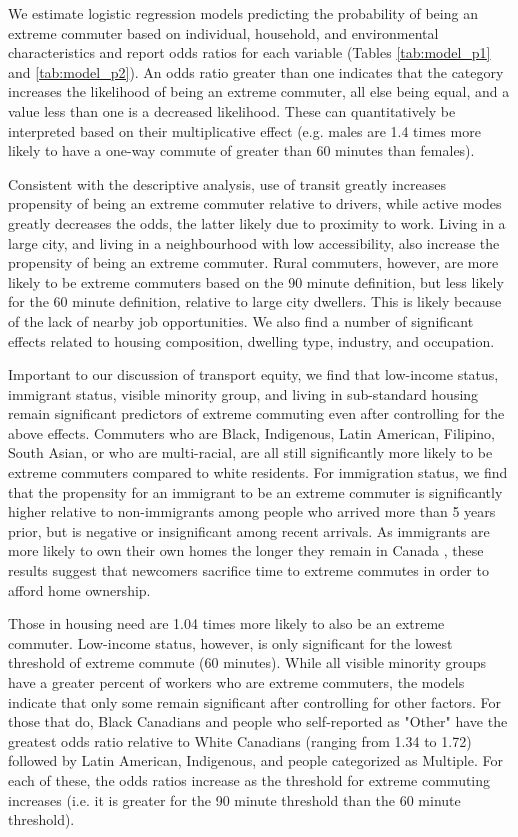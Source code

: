 \documentclass[10 pt,letterpaper]{article}
\begin{document}
\newpage


We estimate logistic regression models predicting the probability of being an extreme commuter based on individual, household, and environmental characteristics and report odds ratios for each variable (Tables \ref{tab:model_p1} and \ref{tab:model_p2}). An odds ratio greater than one indicates that the category increases the likelihood of being an extreme commuter, all else being equal, and a value less than one is a decreased likelihood. These can quantitatively be interpreted based on their multiplicative effect (e.g. males are 1.4 times more likely to have a one-way commute of greater than 60 minutes than females). 

Consistent with the descriptive analysis, use of transit greatly increases propensity of being an extreme commuter relative to drivers, while active modes greatly decreases the odds, the latter likely due to proximity to work. Living in a large city, and living in a neighbourhood with low accessibility, also increase the propensity of being an extreme commuter. Rural commuters, however, are more likely to be extreme commuters based on the 90 minute definition, but less likely for the 60 minute definition, relative to large city dwellers. This is likely because of the lack of nearby job opportunities. We also find a number of significant effects related to housing composition, dwelling type, industry, and occupation. 

Important to our discussion of transport equity, we find that low-income status, immigrant status, visible minority group, and living in sub-standard housing remain significant predictors of extreme commuting even after controlling for the above effects. Commuters who are Black, Indigenous, Latin American, Filipino, South Asian, or who are multi-racial, are all still significantly more likely to be extreme commuters compared to white residents. For immigration status, we find that the propensity for an immigrant to be an extreme commuter is significantly higher relative to non-immigrants among people who arrived more than 5 years prior, but is negative or insignificant among recent arrivals. As immigrants are more likely to own their own homes the longer they remain in Canada \cite{simone2014housing}, these results suggest that newcomers sacrifice time to extreme commutes in order to afford home ownership.

Those in housing need are 1.04 times more likely to also be an extreme commuter. Low-income status, however, is only significant for the lowest threshold of extreme commute (60 minutes).  While all visible minority groups have a greater percent of workers who are extreme commuters, the models indicate that only some remain significant after controlling for other factors. For those that do, Black Canadians and people who self-reported as "Other" have the greatest odds ratio relative to White Canadians (ranging from 1.34 to 1.72) followed by Latin American, Indigenous, and people categorized as Multiple. For each of these, the odds ratios increase as the threshold for extreme commuting increases (i.e. it is greater for the 90 minute threshold than the 60 minute threshold).
\end{document}
